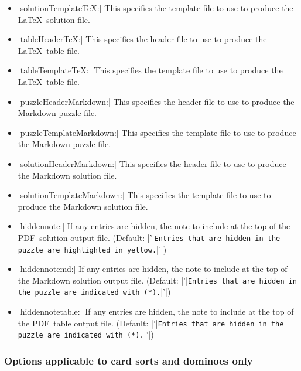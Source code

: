 \documentclass{article}
\def\PDF{{\small PDF}}
\begin{document}
\begin{itemize}
  use to produce the \LaTeX\ solution file.
\item |solutionTemplateTeX:| This specifies the template file to
  use to produce the \LaTeX\ solution file.
\item |tableHeaderTeX:| This specifies the header file to
  use to produce the \LaTeX\ table file.
\item |tableTemplateTeX:| This specifies the template file to
  use to produce the \LaTeX\ table file.
\item |puzzleHeaderMarkdown:| This specifies the header file to
  use to produce the Markdown puzzle file.
\item |puzzleTemplateMarkdown:| This specifies the template file to
  use to produce the Markdown puzzle file.
\item |solutionHeaderMarkdown:| This specifies the header file to
  use to produce the Markdown solution file.
\item |solutionTemplateMarkdown:| This specifies the template file to
  use to produce the Markdown solution file.
\item |hiddennote:| If any entries are hidden, the note to include at
  the top of the \PDF\ solution output file.  (Default:
  |'|\texttt{Entries that are hidden in the puzzle are highlighted in
    yellow.}|'|)
\item |hiddennotemd:| If any entries are hidden, the note to include
  at the top of the Markdown solution output file.  (Default:
  |'|\texttt{Entries that are hidden in the puzzle are indicated with
    (*).}|'|)
\item |hiddennotetable:| If any entries are hidden, the note to
  include at the top of the \PDF\ table output file.  (Default:
  |'|\texttt{Entries that are hidden in the puzzle are indicated with
    (*).}|'|)
\end{itemize}

\subsubsection*{Options applicable to card sorts and dominoes only}
\end{document}
